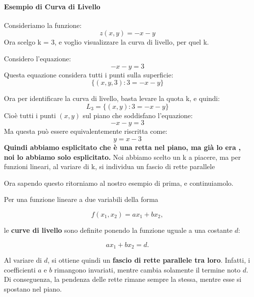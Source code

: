 \paragraph{Esempio di Curva di Livello}
Consideriamo la funzione:
\begin{equation}
    z(x,y) = -x-y
\end{equation}
Ora scelgo k = 3, e voglio visualizzare la curva di livello, per quel k.

Considero l'equazione:
\begin{equation}
    -x-y = 3
\end{equation}
Questa equazione considera tutti i punti sulla superficie:
\begin{equation}
    \{(x,y,3) : 3 = -x - y \}
\end{equation}

Ora per identificare la curva di livello, basta levare la quota k, e quindi:
\begin{equation}
    L_3 = \{(x,y) : 3 = -x - y \}
\end{equation}
Cioè tutti i punti $(x,y)$ sul piano che soddisfano l'equazione:
\begin{equation}
    -x-y = 3
\end{equation}
Ma questa può essere equivalentemente riscritta come:
\begin{equation}
    y = x-3
\end{equation}
\textbf{Quindi abbiamo esplicitato che è una retta nel piano, ma già lo era , noi lo abbiamo solo esplicitato.}
Noi abbiamo scelto un k a piacere, ma per funzioni lineari, al variare di k, si individua un fascio di rette parallele



Ora sapendo questo ritorniamo al nostro esempio di prima, e continuiamolo.

Per una funzione lineare a due variabili della forma

\begin{equation}
f(x_1,x_2) = ax_1 + bx_2,
\end{equation}

le \textbf{curve di livello} sono definite ponendo la funzione uguale a una costante \(d\):

\begin{equation}
ax_1 + bx_2 = d.
\end{equation}

Al variare di \(d\), si ottiene quindi un \textbf{fascio di rette parallele tra loro}. Infatti, i coefficienti \(a\) e \(b\) rimangono invariati, mentre cambia solamente il termine noto \(d\). Di conseguenza, la pendenza delle rette rimane sempre la stessa, mentre esse si spostano nel piano.

